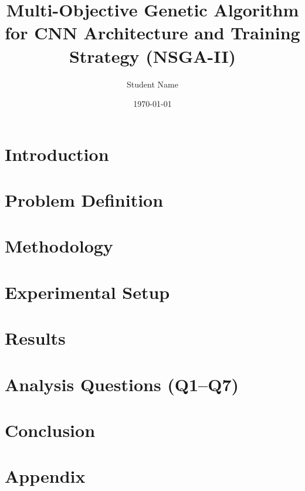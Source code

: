 \documentclass[11pt]{article}
\title{Multi-Objective Genetic Algorithm for CNN Architecture and Training Strategy (NSGA-II)}
\author{Student Name}
\date{\today}
\begin{document}
\maketitle

\begin{abstract}

\end{abstract}

\section{Introduction}


\section{Problem Definition}


\section{Methodology}


\section{Experimental Setup}


\section{Results}


\section{Analysis Questions (Q1--Q7)}


\section{Conclusion}


\appendix
\section{Appendix}

\end{document}
